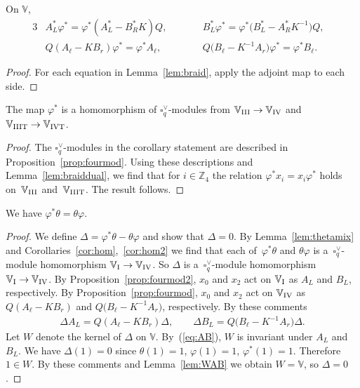 \begin{Lemma}\label{lem:braiddual}On $\mathbb V$,
\begin{alignat*}{3}
& A^*_L\varphi^*=\varphi^*(A^*_L- B^*_R K)Q,\qquad &&
B^*_L \varphi^*=\varphi^* \big(B^*_L-A^*_R K^{-1}\big)Q, &\\ %
&Q(A_\ell-K B_r ) \varphi^*=\varphi^*A_\ell,\qquad && Q\big(B_\ell- K^{-1}A_r\big)
\varphi^*=\varphi^*B_\ell.&%
\end{alignat*}
\end{Lemma}
\begin{proof}For each equation in Lemma~\ref{lem:braid}, apply the adjoint map to each side.
\end{proof}

\begin{Corollary}\label{cor:hom2}The map $\varphi^*$ is a homomorphism of $\square^\vee_q$-modules from
 $\mathbb V_{\rm III} \to \mathbb V_{\rm IV}$ and $\mathbb V_{\rm IIIT} \to \mathbb V_{\rm IVT}$.
\end{Corollary}
\begin{proof}The $\square^\vee_q$-modules in the corollary statement are described in Proposition~\ref{prop:fourmod}. Using these descriptions and Lemma~\ref{lem:braiddual}, we find that for $i \in \mathbb Z_4$ the relation $ \varphi^* x_i = x_i \varphi^*$ holds on~$\mathbb V_{\rm III}$ and~$\mathbb V_{\rm IIIT}$. The result follows.
\end{proof}

\begin{Lemma}\label{lem:thphi}We have $\varphi^* \theta = \theta \varphi$.
\end{Lemma}
\begin{proof}We define $\Delta = \varphi^* \theta-\theta \varphi$ and show that $\Delta=0$. By Lemma~\ref{lem:thetamix} and Corolla\-ries~\ref{cor:hom},~\ref{cor:hom2} we find that each of~$\varphi^* \theta $ and $\theta \varphi $ is a~$\square^\vee_q$-module homomorphism $\mathbb V_{\rm I} \to \mathbb V_{\rm IV}$. So $\Delta$ is a~$\square^\vee_q$-module homomorphism $\mathbb V_{\rm I} \to \mathbb V_{\rm IV}$. By Proposition~\ref{prop:fourmod2}, $x_0$ and $x_2$ act on $\mathbb V_{\rm I}$ as $A_L$ and $B_L$, respectively. By Proposition~\ref{prop:fourmod}, $x_0$ and $x_2$ act on $\mathbb V_{\rm IV}$ as $Q (A_\ell-K B_r)$ and $Q \big(B_\ell-K^{-1} A_r\big)$, respectively. By these comments
\begin{gather}
\Delta A_L = Q (A_\ell-K B_r) \Delta,\qquad \Delta B_L = Q \big(B_\ell-K^{-1} A_r\big) \Delta.\label{eq:AB}
\end{gather}
Let $W$ denote the kernel of $\Delta$ on $\mathbb V$. By~(\ref{eq:AB}), $W$ is invariant under $A_L$ and $B_L$. We have $\Delta(1)=0$ since $\theta(1)=1$, $\varphi(1)=1$, $\varphi^*(1)=1$. Therefore $1 \in W$. By these comments and Lemma~\ref{lem:WAB} we obtain $W=\mathbb V$, so $\Delta=0$.
\end{proof}

